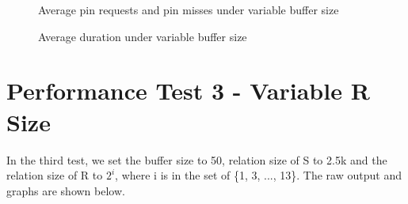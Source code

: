\documentclass{article}
\begin{document}
\newpage
\begin{figure}[!htbp]
  \centering
  \caption{Average pin requests and pin misses under variable buffer size}
    \label{fig: 2-1}
\end{figure}
\begin{figure}[!htbp]
  \centering
  \caption{Average duration under variable buffer size}
    \label{fig: 2-2}
\end{figure}

\newpage
\section{Performance Test 3 - Variable R Size}
In the third test, we set the buffer size to 50, relation size of S to 2.5k and the relation size of R to $2^i$, where i is in the set of \{1, 3, ..., 13\}. The raw output and graphs are shown below. \\
\end{document}
